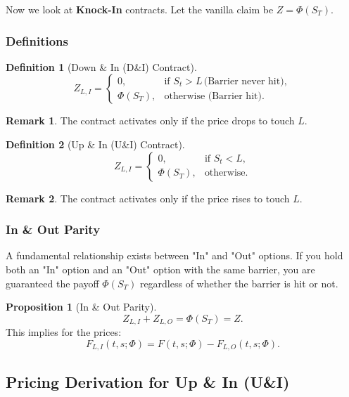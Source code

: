 \documentclass[12pt,a4paper]{article}
\theoremstyle{definition}
\newtheorem{definition}{Definition}[section]
\newtheorem{proposition}{Proposition}[section]
\newtheorem{remark}{Remark}[section]
\begin{document}
Now we look at \textbf{Knock-In} contracts. Let the vanilla claim be $Z = \Phi(S_T)$.

\subsubsection{Definitions}

\begin{definition}[Down \& In (D\&I) Contract]
\[
Z_{L,I} = 
\begin{cases}
0, & \text{if } S_t > L\, \text{(Barrier never hit)}, \\
\Phi(S_T), & \text{otherwise (Barrier hit)}.
\end{cases}
\]
\end{definition}

\begin{remark}
The contract activates only if the price drops to touch $L$.
\end{remark}

\begin{definition}[Up \& In (U\&I) Contract]
\[
Z_{L,I} = 
\begin{cases}
0, & \text{if } S_t < L, \\
\Phi(S_T), & \text{otherwise}.
\end{cases}
\]
\end{definition}

\begin{remark}
The contract activates only if the price rises to touch $L$.
\end{remark}

\subsubsection{In \& Out Parity}

A fundamental relationship exists between "In" and "Out" options. If you hold both an "In" option and an "Out" option with the same barrier, you are guaranteed the payoff $\Phi(S_T)$ regardless of whether the barrier is hit or not.

\begin{proposition}[In \& Out Parity]
\[
Z_{L,I} + Z_{L,O} = \Phi(S_T) = Z.
\]
This implies for the prices:
\[
F_{L,I}(t, s; \Phi) = F(t, s; \Phi) - F_{L,O}(t, s; \Phi).
\]
\end{proposition}

\subsection{Pricing Derivation for Up \& In (U\&I)}
\end{document}

